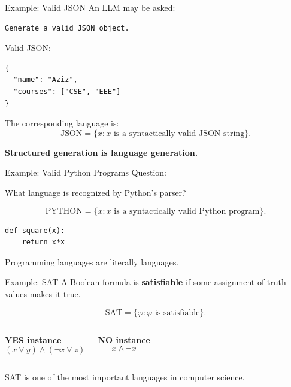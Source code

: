 \documentclass[10pt,aspectratio=169]{beamer}
\newcommand{\term}[1]{\textcolor{tocblue}{\textbf{#1}}}
\newcommand{\keyidea}[1]{\begin{center}\alert{\textbf{#1}}\end{center}}
\begin{document}
\begin{frame}[fragile]{Example: Valid JSON}
An LLM may be asked:

\begin{lstlisting}
Generate a valid JSON object.
\end{lstlisting}

\pause
Valid JSON:
\begin{lstlisting}
{
  "name": "Aziz",
  "courses": ["CSE", "EEE"]
}
\end{lstlisting}

\pause
The corresponding language is:
\[
\mathrm{JSON} = \{x : x \text{ is a syntactically valid JSON string}\}.
\]

\pause
\keyidea{Structured generation is language generation.}
\end{frame}

\begin{frame}[fragile]{Example: Valid Python Programs}
Question:

\begin{center}
What language is recognized by Python's parser?
\end{center}

\pause
\[
\mathrm{PYTHON} = \{x : x \text{ is a syntactically valid Python program}\}.
\]

\pause
\begin{lstlisting}
def square(x):
    return x*x
\end{lstlisting}

\pause
\begin{center}
Programming languages are literally languages.
\end{center}
\end{frame}

\begin{frame}{Example: SAT}
A Boolean formula is \term{satisfiable} if some assignment of truth values makes it true.

\pause
\[
\mathrm{SAT} = \{\varphi : \varphi \text{ is satisfiable}\}.
\]

\pause
\begin{columns}[T]
\textbf{YES instance}
\[
(x \lor y) \land (\neg x \lor z)
\]

\textbf{NO instance}
\[
x \land \neg x
\]
\end{columns}

\pause
\vspace{1em}
\begin{center}
SAT is one of the most important languages in computer science.
\end{center}
\end{frame}
\end{document}
